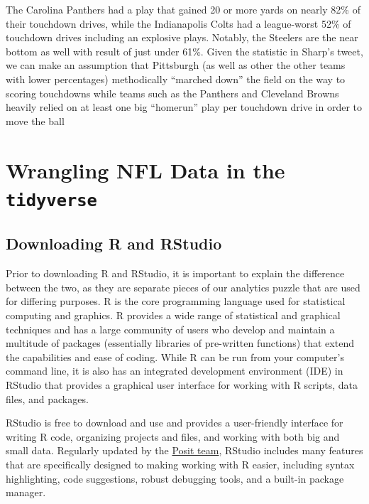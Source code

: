 \documentclass[
  letterpaper,
]{krantz}
\begin{document}
The Carolina Panthers had a play that gained 20 or more yards on nearly
82\% of their touchdown drives, while the Indianapolis Colts had a
league-worst 52\% of touchdown drives including an explosive plays.
Notably, the Steelers are the near bottom as well with result of just
under 61\%. Given the statistic in Sharp's tweet, we can make an
assumption that Pittsburgh (as well as other the other teams with lower
percentages) methodically ``marched down'' the field on the way to
scoring touchdowns while teams such as the Panthers and Cleveland Browns
heavily relied on at least one big ``homerun'' play per touchdown drive
in order to move the ball


\hypertarget{wrangling-nfl-data-in-the-tidyverse}{%
\chapter{\texorpdfstring{Wrangling NFL Data in the
\texttt{tidyverse}}{Wrangling NFL Data in the tidyverse}}\label{wrangling-nfl-data-in-the-tidyverse}}

\hypertarget{downloading-r-and-rstudio}{%
\section{Downloading R and RStudio}\label{downloading-r-and-rstudio}}

Prior to downloading R and RStudio, it is important to explain the
difference between the two, as they are separate pieces of our analytics
puzzle that are used for differing purposes. R is the core programming
language used for statistical computing and graphics. R provides a wide
range of statistical and graphical techniques and has a large community
of users who develop and maintain a multitude of packages (essentially
libraries of pre-written functions) that extend the capabilities and
ease of coding. While R can be run from your computer's command line, it
is also has an integrated development environment (IDE) in RStudio that
provides a graphical user interface for working with R scripts, data
files, and packages.

RStudio is free to download and use and provides a user-friendly
interface for writing R code, organizing projects and files, and working
with both big and small data. Regularly updated by the
\href{https://posit.co/}{Posit team}, RStudio includes many features
that are specifically designed to making working with R easier,
including syntax highlighting, code suggestions, robust debugging tools,
and a built-in package manager.
\end{document}
